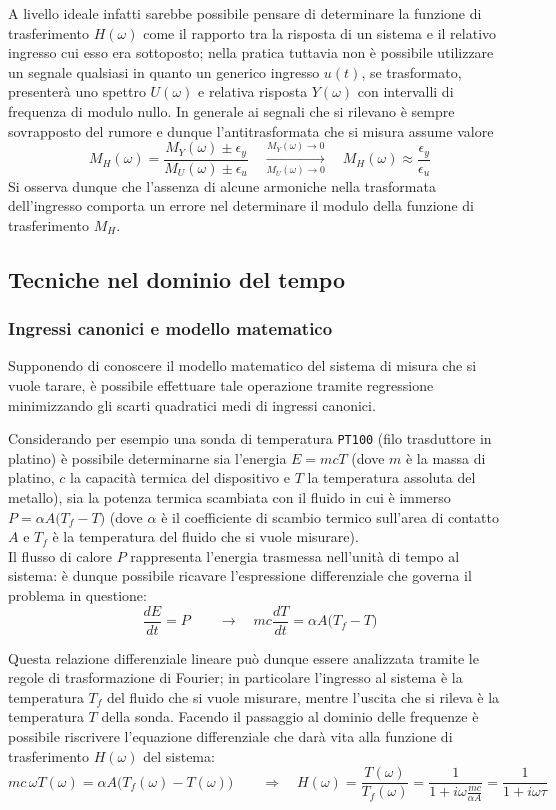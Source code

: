		A livello ideale infatti sarebbe possibile pensare di determinare la funzione di trasferimento $H(\omega)$ come il rapporto tra la risposta di un sistema e il relativo ingresso cui esso era sottoposto; nella pratica tuttavia non è possibile utilizzare un segnale qualsiasi in quanto un generico ingresso $u(t)$, se trasformato, presenterà uno spettro $U(\omega)$ e relativa risposta $Y(\omega)$ con intervalli di frequenza di modulo nullo. In generale ai segnali che si rilevano è sempre sovrapposto del rumore e dunque l'antitrasformata che si misura assume valore
		\[ M_H(\omega) = \frac{M_Y(\omega) \pm \epsilon_y}{ M_U(\omega) \pm \epsilon_u } \quad \xrightarrow[M_U(\omega)\rightarrow 0]{M_Y(\omega) \rightarrow 0} \quad M_H(\omega) \approx \frac {\epsilon_y}{\epsilon_u} \]
		Si osserva dunque che l'assenza di alcune armoniche nella trasformata dell'ingresso comporta un errore nel determinare il modulo della funzione di trasferimento $M_H$.		
	
	\subsection{Tecniche nel dominio del tempo}
		\subsubsection{Ingressi canonici e modello matematico}
		Supponendo di conoscere il modello matematico del sistema di misura che si vuole tarare, è possibile effettuare tale operazione tramite regressione minimizzando gli scarti quadratici medi di ingressi canonici.
		
		Considerando per esempio una sonda di temperatura \texttt{PT100} (filo trasduttore in platino) è possibile determinarne sia l'energia $E = mc T$ (dove $m$ è la massa di platino, $c$ la capacità termica del dispositivo e $T$ la temperatura assoluta del metallo), sia la potenza termica scambiata con il fluido in cui è immerso $P = \alpha A \big(T_f - T\big)$ (dove $\alpha$ è il coefficiente di scambio termico sull'area di contatto $A$ e $T_f$ è la temperatura del fluido che si vuole misurare). \\
		Il flusso di calore $P$ rappresenta l'energia trasmessa nell'unità di tempo al sistema: è dunque possibile ricavare l'espressione differenziale che governa il problema in questione:
		\[ \frac{dE}{dt} = P \qquad \rightarrow \quad mc \frac{dT}{dt}  = \alpha A \big(T_f - T \big)  \]
		
		Questa relazione differenziale lineare può dunque essere analizzata tramite le regole di trasformazione di Fourier; in particolare l'ingresso al sistema è la temperatura $T_f$ del fluido che si vuole misurare, mentre l'uscita che si rileva è la temperatura $T$ della sonda. Facendo il passaggio al dominio delle frequenze è possibile riscrivere l'equazione differenziale che darà vita alla funzione di trasferimento $H(\omega)$ del sistema:
		\[ mc \, \omega T(\omega) = \alpha A \Big(T_f(\omega) - T(\omega)\Big) \qquad \Rightarrow \quad H(\omega) = \frac{T(\omega)}{T_f(\omega)} = \frac 1 {1+ i\omega \frac{mc}{\alpha A}} = \frac 1 {1+ i\omega \tau} \]
		
